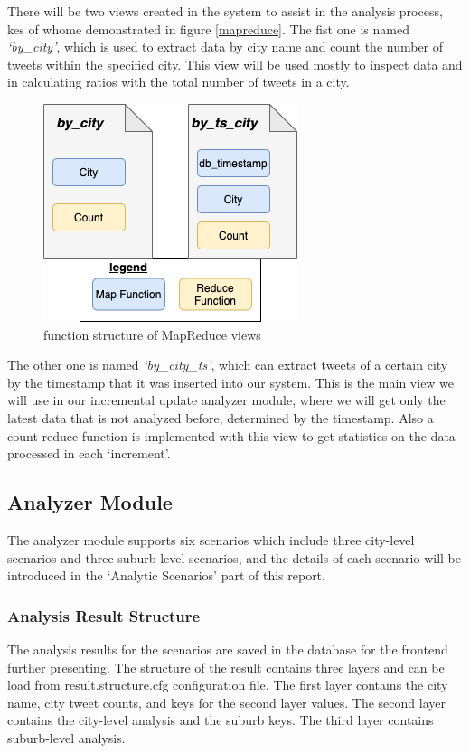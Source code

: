 \documentclass{article}
\begin{document}
There will be two views created in the system to assist in the analysis process, kes of whome demonstrated in figure \ref{mapreduce}. The fist one is named \textit{‘by\_city’}, which is used to extract data by city name and count the number of tweets within the specified city. This view will be used mostly to inspect data and in calculating ratios with the total number of tweets in a city.
\begin{figure}
\centering
\includegraphics{img/mapreduce.png}
\caption{function structure of MapReduce views}
\label{fig:mapreduce}
\end{figure}

The other one is named \textit{‘by\_city\_ts’}, which can extract tweets of a certain city by the timestamp that it was inserted into our system. This is the main view we will use in our incremental update analyzer module, where we will get only the latest data that is not analyzed before, determined by the timestamp. Also a count reduce function is implemented with this view to get statistics on the data processed in each ‘increment’.

\subsection{Analyzer Module}
The analyzer module supports six scenarios which include three city-level scenarios and three suburb-level scenarios, and the details of each scenario will be introduced in the ‘Analytic Scenarios’ part of this report.
\subsubsection{Analysis Result Structure}
The analysis results for the scenarios are saved in the database for the frontend further presenting. The structure of the result contains three layers and can be load from result.structure.cfg configuration file. The first layer contains the city name, city tweet counts, and keys for the second layer values. The second layer contains the city-level analysis and the suburb keys. The third layer contains suburb-level analysis.
\end{document}
